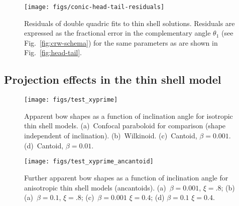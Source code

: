



\begin{figure*}
  \centering
  \texttt{[image: figs/conic-head-tail-residuals]}
  \caption[]{Residuals of double quadric fits to thin shell solutions.
    Residuals are expressed as the fractional error in the
    complementary angle \(\theta_1\) (see Fig.~\ref{fig:crw-schema}) for
    the same parameters as are shown in Fig.~\ref{fig:head-tail}.}
  \label{fig:head-tail-residuals}
\end{figure*}

\subsection{Projection effects in the thin shell model}
\label{sec:proj-effects-thin}


\begin{figure*}
  \centering
  \texttt{[image: figs/test\_xyprime]}
  \caption{Apparent bow shapes as a function of inclination angle for
    isotropic thin shell models. (a)~Confocal paraboloid for
    comparison (shape independent of inclination).
    (b)~Wilkinoid. (c)~Cantoid, \(\beta = 0.001\). (d)~Cantoid,
    \(\beta = 0.01\). }
  \label{fig:xyprime}
\end{figure*}

\begin{figure*}
  \centering
  \texttt{[image: figs/test\_xyprime\_ancantoid]}
  \caption{Further apparent bow shapes as a function of inclination
    angle for anisotropic thin shell models (ancantoids).
    (a)~\(\beta = 0.001\), \(\xi =.8\); (b) (a)~\(\beta = 0.1\),
    \(\xi =.8\); (c)~\(\beta = 0.001\) \(\xi =0.4\); (d)
    \(\beta = 0.1\) \(\xi =0.4\).}
  \label{fig:xyprime-anacantoid}
\end{figure*}


